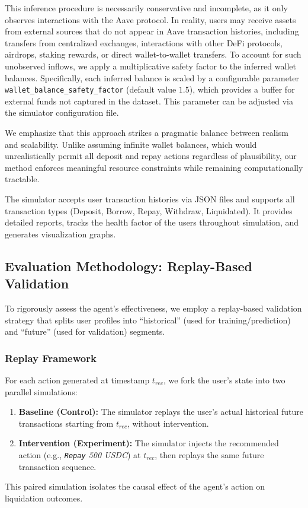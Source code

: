 \documentclass[manuscript,screen,review]{acmart}
\begin{document}
This inference procedure is necessarily conservative and incomplete, as it only observes interactions with the Aave protocol. In reality, users may receive assets from external sources that do not appear in Aave transaction histories, including transfers from centralized exchanges, interactions with other DeFi protocols, airdrops, staking rewards, or direct wallet-to-wallet transfers. To account for such unobserved inflows, we apply a multiplicative safety factor to the inferred wallet balances. Specifically, each inferred balance is scaled by a configurable parameter \texttt{wallet\_balance\_safety\_factor} (default value $1.5$), which provides a buffer for external funds not captured in the dataset. This parameter can be adjusted via the simulator configuration file.

We emphasize that this approach strikes a pragmatic balance between realism and scalability. Unlike assuming infinite wallet balances, which would unrealistically permit all deposit and repay actions regardless of plausibility, our method enforces meaningful resource constraints while remaining computationally tractable. 

The simulator accepts user transaction histories via JSON files and supports all transaction types (Deposit, Borrow, Repay, Withdraw, Liquidated). It provides detailed reports, tracks the health factor of the users throughout simulation, and generates visualization graphs.

\subsection{Evaluation Methodology: Replay-Based Validation}
\label{sec:experimental_validation}
To rigorously assess the agent's effectiveness, we employ a replay-based validation strategy that splits user profiles into ``historical'' (used for training/prediction) and ``future'' (used for validation) segments.

\subsubsection{Replay Framework}
For each action generated at timestamp $t_{rec}$, we fork the user's state into two parallel simulations:
\begin{enumerate}
    \item \textbf{Baseline (Control):} The simulator replays the user's actual historical future transactions starting from $t_{rec}$, without intervention.
    \item \textbf{Intervention (Experiment):} The simulator injects the recommended action (e.g., \textit{\texttt{Repay} 500 USDC}) at $t_{rec}$, then replays the same future transaction sequence.
\end{enumerate}
This paired simulation isolates the causal effect of the agent's action on liquidation outcomes.
\end{document}
